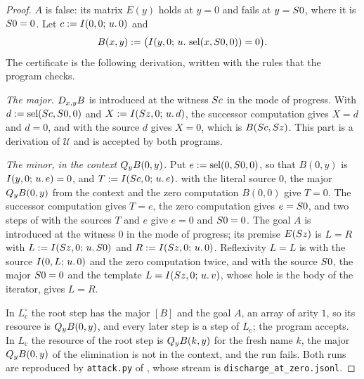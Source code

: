 \begin{proof}
$A$ is false: its matrix $E(y)$ holds at $y=0$ and fails at $y=S 0$, where
it is $S 0=0$. Let $c\mathrel{:=}I(0,0;\,u.\,0)$ and
\[
 B(x,y)\mathrel{:=}\bigl(I(y,0;\,u.\,\operatorname{sel}(x,S 0,0))=0\bigr).
\]
The certificate is the following derivation, written with the rules that the
program checks.

\emph{The major.} $D_{x,y}B$ is introduced at the witness $S c$ in the mode
of progress. With $d\mathrel{:=}\operatorname{sel}(S c,S 0,0)$ and
$X\mathrel{:=}I(S z,0;\,u.\,d)$, the successor computation gives $X=d$ and
$d=0$, and  with the source $d$ gives $X=0$, which is
$B(S c,S z)$. This part is a derivation of $\mathcal U$ and is accepted
by both programs.

\emph{The minor, in the context $Q_{y}B(0,y)$.} Put $e\mathrel{:=}\operatorname{sel}(0,S 0,0)$,
so that $B(0,y)$ is $I(y,0;\,u.\,e)=0$, and $T\mathrel{:=}I(S c,0;\,u.\,e)$.
 with the literal source $0$, the major $Q_{y}B(0,y)$ from the
context and the zero computation $B(0,0)$ give $T=0$. The successor
computation gives $T=e$, the zero computation gives $e=S 0$, and two steps
of  with the sources $T$ and $e$ give $e=0$ and $S 0=0$. The
goal $A$ is introduced at the witness $0$ in the mode of progress; its premise
$E(S z)$ is $L=R$ with $L\mathrel{:=}I(S z,0;\,u.\,S 0)$ and
$R\mathrel{:=}I(S z,0;\,u.\,0)$. Reflexivity $L=L$ is  with the
source $I(0,L;\,u.\,0)$ and the zero computation twice, and  with
the source $S 0$, the major $S 0=0$ and the template
$L=I(S z,0;\,u.\,v)$, whose hole is the body of the iterator, gives $L=R$.

In $L^{\circ}_{\mathrm c}$ the root step has the major $[B]$ and the goal
$A$, an array of arity $1$, so its resource is $Q_{y}B(0,y)$, and every later
step is a step of $L_{\mathrm c}$; the program accepts. In $L_{\mathrm c}$ the
resource of the root step is $Q_{y}B(k,y)$ for the fresh name $k$, the major
$Q_{y}B(0,y)$ of the elimination is not in the context, and the run fails.
Both runs are reproduced by \texttt{attack.py} of , whose
stream is \texttt{discharge\_at\_zero.jsonl}.
\end{proof}

